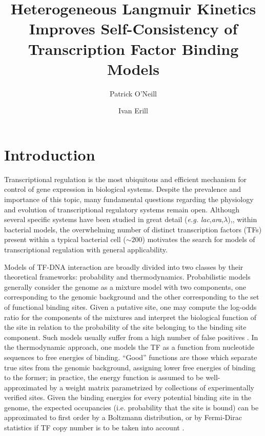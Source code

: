 \documentclass{article}
\begin{document}
\title{Heterogeneous Langmuir Kinetics Improves Self-Consistency of Transcription Factor Binding Models}
\author[1]{Patrick O'Neill}
\author[1]{Ivan Erill}
\maketitle{}
\section{Introduction}

\doublespacing Transcriptional regulation is the most ubiquitous and
efficient mechanism for control of gene expression in biological
systems.  Despite the prevalence and importance of this topic, many
fundamental questions regarding the physiology and evolution of
transcriptional regulatory systems remain open.  Although several
specific systems have been studied in great detail
(\textit{e.g.} \textit{lac},\textit{ara},$\lambda$)\cite{riggs70},\cite{hamilton88},\cite{ptashne67}
within bacterial models, the overwhelming number of distinct
transcription factors (TFs) present within a typical bacterial cell
($\sim 200$) motivates the search for models of transcriptional
regulation with general applicability.

Models of TF-DNA interaction are broadly divided into two classes by
their theoretical frameworks: probability and thermodynamics.
Probabilistic models generally consider the genome as a mixture model
with two components, one corresponding to the genomic background and
the other corresponding to the set of functional binding sites.  Given
a putative site, one may compute the log-odds ratio for the components
of the mixtures and interpret the biological function of the site in
relation to the probability of the site belonging to the binding site
component.  Such models usually suffer from a high number of false
positives \cite{erill09}.  In the thermodynamic approach, one models
the TF as a function from nucleotide sequences to free energies of
binding.  ``Good'' functions are those which separate true sites from
the genomic background, assigning lower free energies of binding to
the former; in practice, the energy function is assumed to be
well-approximated by a weight matrix parametrized by collections of
experimentally verified sites.  Given the binding energies for every
potential binding site in the genome, the expected occupancies
(i.e. probability that the site is bound) can be approximated to first
order by a Boltzmann distribution, or by Fermi-Dirac statistics if TF
copy number is to be taken into account \cite{gerland02}.
\end{document}
